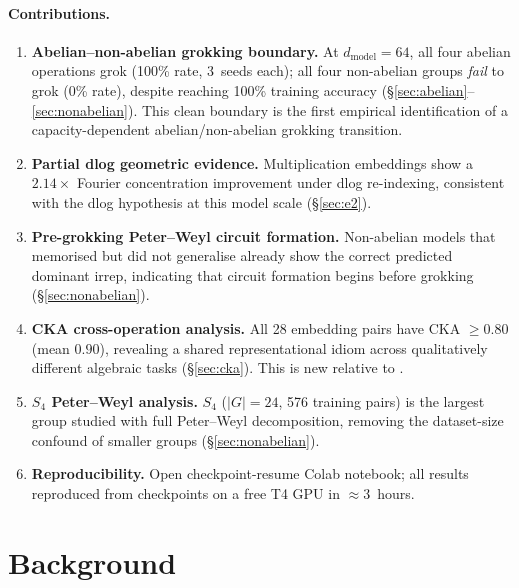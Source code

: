 \documentclass[11pt]{article}
\begin{document}
\paragraph{Contributions.}
\begin{enumerate}
  \item \textbf{Abelian--non-abelian grokking boundary.}
        At $d_{\text{model}}=64$, all four abelian operations grok
        (100\% rate, 3~seeds each); all four non-abelian groups
        \emph{fail} to grok (0\% rate), despite reaching 100\% training
        accuracy (\S\ref{sec:abelian}--\ref{sec:nonabelian}).
        This clean boundary is the first empirical identification of a
        capacity-dependent abelian/non-abelian grokking transition.

  \item \textbf{Partial dlog geometric evidence.}
        Multiplication embeddings show a $2.14\times$ Fourier concentration
        improvement under dlog re-indexing, consistent with the dlog
        hypothesis at this model scale (\S\ref{sec:e2}).

  \item \textbf{Pre-grokking Peter--Weyl circuit formation.}
        Non-abelian models that memorised but did not generalise already
        show the correct predicted dominant irrep, indicating that circuit
        formation begins before grokking (\S\ref{sec:nonabelian}).

  \item \textbf{CKA cross-operation analysis.}
        All 28 embedding pairs have CKA $\geq 0.80$ (mean $0.90$),
        revealing a shared representational idiom across qualitatively
        different algebraic tasks (\S\ref{sec:cka}).
        This is new relative to \citet{chughtai2023toy}.

  \item \textbf{$S_4$ Peter--Weyl analysis.}
        $S_4$ ($|G|{=}24$, 576 training pairs) is the largest group
        studied with full Peter--Weyl decomposition, removing the
        dataset-size confound of smaller groups (\S\ref{sec:nonabelian}).

  \item \textbf{Reproducibility.}
        Open checkpoint-resume Colab notebook; all results reproduced
        from checkpoints on a free T4 GPU in $\approx3$~hours.
\end{enumerate}

\section{Background}
\label{sec:background}
\end{document}
